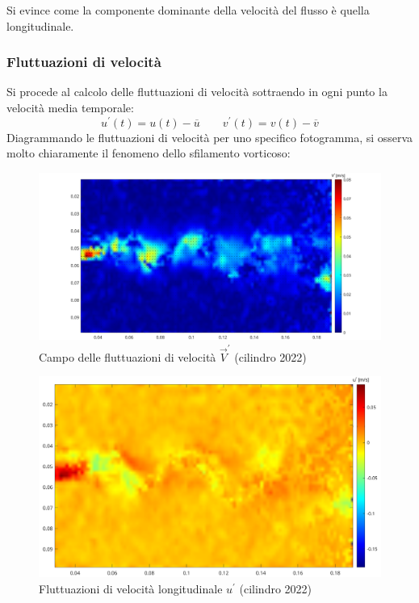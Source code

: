 \noindent Si evince come la componente dominante della velocità del flusso è quella longitudinale.

\subsubsection{Fluttuazioni di velocità}
Si procede al calcolo delle fluttuazioni di velocità sottraendo in ogni punto la velocità media temporale:
\begin{equation*}
    u^\prime(t) = u(t) - \overline u \qquad v^\prime(t) = v(t) - \overline v  
\end{equation*}
Diagrammando le fluttuazioni di velocità per uno specifico fotogramma, si osserva molto chiaramente il fenomeno dello sfilamento vorticoso:
\begin{figure}[H]
    \centering
    \includegraphics[width=.95\textwidth]{images/11/flutt.png}
    \caption{Campo delle fluttuazioni di velocità $\vec V^\prime$ (cilindro 2022)}
\end{figure}
\begin{figure}[H]
    \centering
    \includegraphics[width=.97\textwidth]{images/11/fluttu.png}
    \caption{Fluttuazioni di velocità longitudinale $u^\prime$ (cilindro 2022)}
\end{figure}
